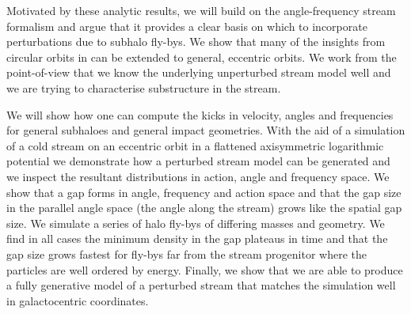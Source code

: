 \documentclass[useAMS,usenatbib,fleqn,a4paper]{mn2e}
\begin{document}
Motivated by these analytic results, we will build on the angle-frequency stream formalism and argue that it provides a clear basis on which to incorporate perturbations due to subhalo fly-bys. We show that many of the insights from circular orbits in \cite{ErkalBelokurov2015} can be extended to general, eccentric orbits. We work from the point-of-view that we know the underlying unperturbed stream model well and we are trying to characterise substructure in the stream.

We will show how one can compute the kicks in velocity, angles and frequencies for general subhaloes and general impact geometries. With the aid of a simulation of a cold stream on an eccentric orbit in a flattened axisymmetric logarithmic potential we demonstrate how a perturbed stream model can be generated and we inspect the resultant distributions in action, angle and frequency space. We show that a gap forms in angle, frequency and action space and that the gap size in the parallel angle space (the angle along the stream) grows like the spatial gap size. We simulate a series of halo fly-bys of differing masses and geometry. We find in all cases the minimum density in the gap plateaus in time and that the gap size grows fastest for fly-bys far from the stream progenitor where the particles are well ordered by energy. Finally, we show that we are able to produce a fully generative model of a perturbed stream that matches the simulation well in galactocentric coordinates.
\end{document}
